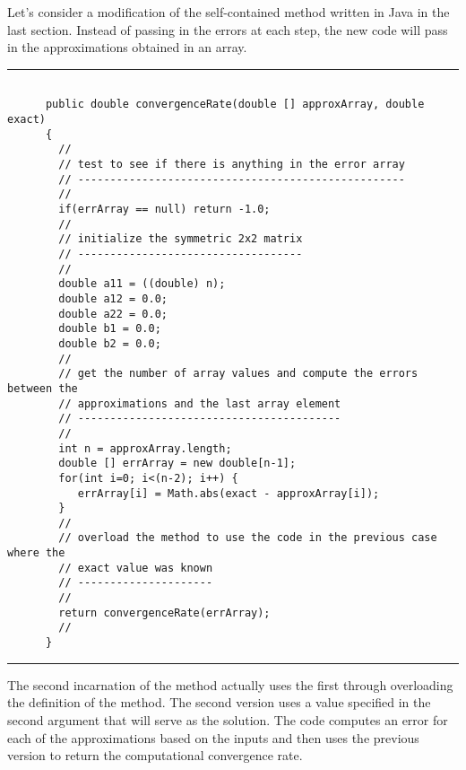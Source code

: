 \documentclass[10pt,fleqn]{article}
\begin{document}
Let's consider a modification of the self-contained method written in Java in
the last section. Instead of passing in the errors at each step, the new code
will pass in the approximations obtained in an array.
\vskip0.1in\hrule\vskip0.1in
\begin{verbatim}

      public double convergenceRate(double [] approxArray, double exact)
      {
        //
        // test to see if there is anything in the error array
        // ---------------------------------------------------
        //
        if(errArray == null) return -1.0;
        //
        // initialize the symmetric 2x2 matrix
        // -----------------------------------
        //
        double a11 = ((double) n);
        double a12 = 0.0;
        double a22 = 0.0;
        double b1 = 0.0;
        double b2 = 0.0;
        //
        // get the number of array values and compute the errors between the
        // approximations and the last array element
        // -----------------------------------------
        //
        int n = approxArray.length;
        double [] errArray = new double[n-1];
        for(int i=0; i<(n-2); i++) {
           errArray[i] = Math.abs(exact - approxArray[i]);
        }
        //
        // overload the method to use the code in the previous case where the
        // exact value was known
        // ---------------------
        //
        return convergenceRate(errArray);
        //
      }

\end{verbatim}
\vskip0.1in\hrule\vskip0.1in
The second incarnation of the method actually uses the first through overloading
the definition of the method. The second version uses a value specified in the
second argument that will serve as the solution.  The code computes an error
for each of the approximations based on the inputs and then uses the previous
version to return the computational convergence rate. 
\end{document}
